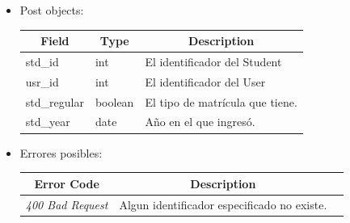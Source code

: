 \documentclass{article}
\begin{document}
\begin{enumerate}
\begin{itemize}
        \item Post objects:
        \begin{table}[H] \centering \begin{tabular}{|l|l|l|} \hline
        \multicolumn{1}{|c|}{\textbf{Field}} &
        \multicolumn{1}{c|}{\textbf{Type}} &
        \multicolumn{1}{c|}{\textbf{Description}} \\ \hline std\_id & int & El
        identificador del Student \\ \hline usr\_id & int & El identificador del
        User \\ \hline std\_regular & boolean & El tipo de matrícula que tiene.
        \\ \hline std\_year & date & Año en el que ingresó. \\ \hline
        \end{tabular} \end{table}
        \item Errores posibles: \begin{table}[H] \centering
        \begin{tabular}{|c|c|l|} \hline \textbf{Error Code} &
        \textbf{Description} \\ \hline \textit{400 Bad Request} & Algun
        identificador especificado no existe. \\ \hline \end{tabular}
        \end{table}
    \end{itemize}


\end{enumerate}
\end{document}
